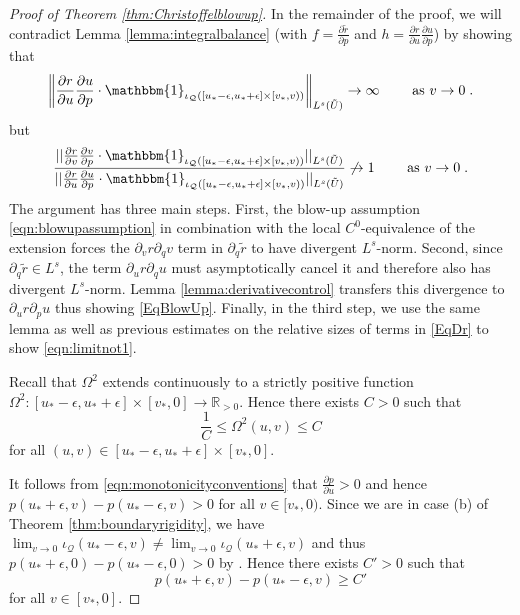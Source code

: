 \documentclass{article}
\newcommand{\Q}{\mathcal{Q}}
\newcommand{\R}{\mathbb{R}}
\begin{document}
\begin{proof}[Proof of Theorem \ref{thm:Christoffelblowup}]
In the remainder of the proof, we will contradict Lemma \ref{lemma:integralbalance} (with $f=\frac{\partial \tilde{r}}{\partial p}$ and $h=\frac{\partial r}{\partial u}\frac{\partial u}{\partial p}$) by showing that
\begin{equation} \label{EqBlowUp}
    \left\| \frac{\partial r}{\partial u}\frac{\partial u}{\partial p}\cdot \mathbbm{1}_{\iota_{\Q}([u_* - \epsilon, u_* + \epsilon]\times [v_*,v))}\right\|_{L^{s}(\tilde{U})}\to\infty \qquad \textnormal{ as } v\to0\;.
\end{equation}
but 
\begin{equation}\label{eqn:limitnot1}
        \frac{|| \frac{\partial r}{\partial v}\frac{\partial v}{\partial p}\cdot \mathbbm{1}_{\iota_{\Q}([u_* - \epsilon, u_* + \epsilon]\times [v_*,v))}||_{L^{s}(\tilde{U})}}{||\frac{\partial r}{\partial u}\frac{\partial u}{\partial p} \cdot \mathbbm{1}_{\iota_{\Q}([u_* - \epsilon, u_* + \epsilon]\times [v_*,v))}||_{L^{s}(\tilde{U})}} \not\to 1 \qquad \textnormal{ as } v \to 0 \;.
\end{equation}
The argument has three main steps. First, the blow-up assumption \eqref{eqn:blowupassumption} in combination with the local $C^0$-equivalence of the extension forces the $\partial_vr\partial_qv$ term in $\partial_q\tilde{r}$ to have divergent $L^s$-norm. Second, since $\partial_q\tilde{r}\in L^s$, the term $\partial_u r\partial_qu$ must asymptotically cancel it and therefore also has divergent $L^s$-norm. Lemma \ref{lemma:derivativecontrol} transfers this divergence to $\partial_ur\partial_pu$ thus showing \eqref{EqBlowUp}. Finally, in the third step, we use the same lemma as well as previous estimates on the relative sizes of terms in \eqref{EqDr} to show \eqref{eqn:limitnot1}.


Recall that $\Omega^2$ extends continuously to a strictly positive function $\Omega^2:[u_*-\epsilon,u_*+\epsilon]\times[v_*,0]\to\R_{>0}$. Hence there exists $C>0$ such that
\begin{equation}\label{eqn:Omegabound}
    \frac{1}{C}\leq \Omega^2(u,v)\leq C
\end{equation}
for all $(u,v)\in[u_*-\epsilon,u_*+\epsilon]\times[v_*,0]$.

It follows from \eqref{eqn:monotonicityconventions} that $\frac{\partial p}{\partial u}>0$ and hence $p(u_*+\epsilon,v)-p(u_*-\epsilon,v)>0$ for all $v\in[v_*,0)$. Since we are in case (b) of Theorem \ref{thm:boundaryrigidity}, we have $\lim_{v\rightarrow0}\iota_\Q(u_*-\epsilon,v)\neq \lim_{v\rightarrow0}\iota_\Q(u_*+\epsilon,v)$ and thus $p(u_*+\epsilon,0)-p(u_*-\epsilon,0)>0$ by \cite[Proposition 3.2 (b)]{CameronSbierski}. Hence there exists $C'>0$ such that 
\begin{equation}
    p(u_*+\epsilon,v)-p(u_*-\epsilon,v)\geq C'
\end{equation}
for all $v\in[v_*,0]$.


\end{proof}
\end{document}
